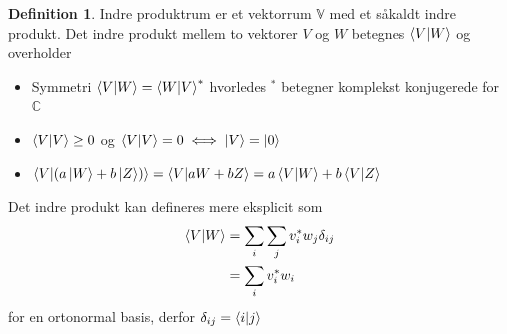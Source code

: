 \documentclass[12pt]{article}
\theoremstyle{definition}
\theoremstyle{remark}
\theoremstyle{definition}
\newtheorem{definition}{Definition}[section]
\newcounter{theo}[section]\setcounter{theo}{0}
\numberwithin{equation}{section}
\begin{document}
\begin{definition}
  Indre produktrum er et vektorrum $\mathbb V$ med et såkaldt indre produkt. Det indre produkt mellem to vektorer $V$ og $W$ betegnes $\braket{V}{W}$ og overholder
  \begin{itemize}
  \item Symmetri $\braket{V}{W} = \braket{W}{V}^*$ hvorledes $^*$ betegner komplekst konjugerede for $\mathbb C$
  \item $\braket{V}{V} \geq 0$ og $\braket{V}{V}=0\iff \ket V = \ket 0$
  \item $\braket{V}{(a\ket W + b\ket Z)} = \braket{V}{aW+bZ} = a\braket{V}{W}+b\braket{V}{Z}$
  \end{itemize}
  Det indre produkt kan defineres mere eksplicit som
  \begin{align}
    \label{eq:1}
    \begin{split}
    \braket{V}{W} &= \sum_i \sum_j v_i^* w_j \delta_{ij} \\
    &= \sum_i v^*_iw_i
    \end{split}
  \end{align}
  for en ortonormal basis, derfor $\delta_{ij}=\braket{i}{j}$
\end{definition}
\end{document}
